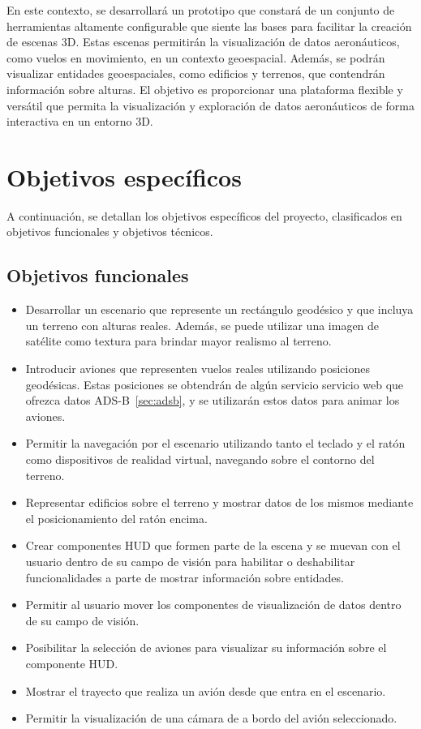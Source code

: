 \documentclass[a4paper, 11pt]{book}
\begin{document}
En este contexto, se desarrollará un prototipo que constará de un conjunto de herramientas altamente configurable que siente las bases para facilitar la creación de escenas \textsc{3D}. 
Estas escenas permitirán la visualización de datos aeronáuticos, como vuelos en movimiento, en un contexto geoespacial. Además, se podrán visualizar entidades geoespaciales, como edificios y terrenos, que contendrán información sobre alturas. El objetivo es proporcionar una plataforma flexible y versátil que permita la visualización y exploración de datos aeronáuticos de forma interactiva en un entorno 3D.
\section{Objetivos específicos} %
\label{sec:objetivosEspecificos} %
A continuación, se detallan los objetivos específicos del proyecto, clasificados en objetivos funcionales y objetivos técnicos.
\subsection{Objetivos funcionales}
\begin{itemize}
	\item Desarrollar un escenario que represente un rectángulo geodésico y que incluya un terreno con alturas reales. Además, se puede utilizar una imagen de satélite como textura para brindar mayor realismo al terreno.
	\item Introducir aviones que representen vuelos reales utilizando posiciones geodésicas. Estas posiciones se obtendrán de algún servicio servicio web que ofrezca datos \textsc{ADS-B}~\ref{sec:adsb}, y se utilizarán estos datos para animar los aviones.
	\item Permitir la navegación por el escenario utilizando tanto el teclado y el ratón como dispositivos de realidad virtual, navegando sobre el contorno del terreno.
	\item Representar edificios sobre el terreno y mostrar datos de los mismos mediante el posicionamiento del ratón encima.
	\item Crear componentes \textsc{\gls{HUD}} que formen parte de la escena y se muevan con el usuario dentro de su campo de visión para habilitar o deshabilitar funcionalidades a parte de mostrar información sobre entidades.
	\item Permitir al usuario mover los componentes de visualización de datos dentro de su campo de visión.
	\item Posibilitar la selección de aviones para visualizar su información sobre el componente \textsc{\gls{HUD}}.
	\item Mostrar el trayecto que realiza un avión desde que entra en el escenario.
	\item Permitir la visualización de una cámara de a bordo del avión seleccionado.
	
\end{itemize}
\end{document}
